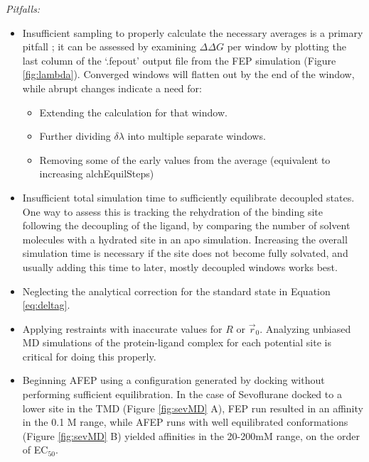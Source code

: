 \documentclass[12pt]{article}
\begin{document}
\textit{Pitfalls:}
\begin{itemize}
	\item Insufficient sampling to properly calculate the necessary averages is a primary pitfall \cite{Pohorille2010}; it can be assessed by examining $\Delta\Delta G$ per window by plotting the last column of the `.fepout' output file from the FEP simulation (Figure \ref{fig:lambda}).  Converged windows will flatten out by the end of the window, while abrupt changes indicate a need for:
		\begin{itemize}
		\item Extending the calculation for that window. 
		\item Further dividing $\delta$$\lambda$ into multiple separate windows.  
		\item Removing some of the early values from the average (equivalent to increasing alchEquilSteps)
		\end{itemize}
	\item Insufficient total simulation time to sufficiently equilibrate decoupled states. One way to assess this is tracking the rehydration of the binding site following the decoupling of the ligand, by comparing the number of solvent molecules with a hydrated site in an apo simulation. Increasing the overall simulation time is necessary if the site does not become fully solvated, and usually adding this time to later, mostly decoupled windows works best.
	\item Neglecting the analytical correction for the standard state in Equation \ref{eq:deltag}.  
	\item Applying restraints with inaccurate values for $R$ or $\vec{r}_{0}$.  Analyzing unbiased MD simulations of the protein-ligand complex for each potential site is critical for doing this properly.  
	\item Beginning AFEP using a configuration generated by docking without performing sufficient equilibration. In the case of Sevoflurane docked to a lower site in the TMD (Figure \ref{fig:sevMD} A), FEP run resulted in an affinity in the 0.1 M range, while AFEP runs with well equilibrated conformations (Figure \ref{fig:sevMD} B) yielded affinities in the 20-200mM range, on the order of EC$_{50}$.  
	\end{itemize}
\end{document}
